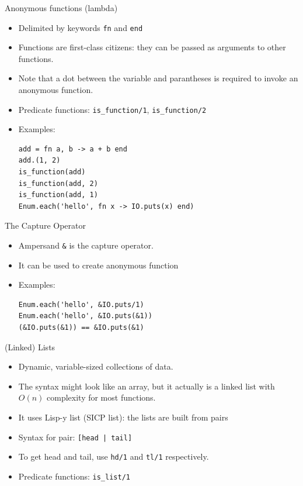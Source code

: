 \documentclass[12pt]{beamer}
\begin{document}
\begin{frame}[fragile]{Anonymous functions (lambda)}
  \begin{itemize}
    \item Delimited by keywords \texttt{fn} and \texttt{end}
    \item Functions are first-class citizens: they can be passed as arguments to other functions.
    \item Note that a dot between the variable and parantheses is required to invoke an anonymous function.
    \item Predicate functions: \texttt{is_function/1}, \texttt{is_function/2}
    \item Examples:
          \begin{verbatim}
add = fn a, b -> a + b end
add.(1, 2)
is_function(add)
is_function(add, 2)
is_function(add, 1)
Enum.each('hello', fn x -> IO.puts(x) end)
        \end{verbatim}
  \end{itemize}
\end{frame}

\begin{frame}[fragile]{The Capture Operator}
  \begin{itemize}
    \item Ampersand \texttt{&} is the capture operator.
    \item It can be used to create anonymous function
    \item Examples:
          \begin{verbatim}
Enum.each('hello', &IO.puts/1)
Enum.each('hello', &IO.puts(&1))
(&IO.puts(&1)) == &IO.puts(&1)
        \end{verbatim}
  \end{itemize}
\end{frame}

\begin{frame}[fragile]{(Linked) Lists}
  \begin{itemize}
    \item Dynamic, variable-sized collections of data.
    \item The syntax might look like an array, but it actually is a linked list with $O(n)$ complexity for most functions.
    \item It uses Lisp-y list (SICP list): the lists are built from pairs
    \item Syntax for pair: \texttt{[head | tail]}
    \item To get head and tail, use \texttt{hd/1} and \texttt{tl/1} respectively.
    \item Predicate functions: \texttt{is_list/1}
  \end{itemize}
\end{frame}
\end{document}
